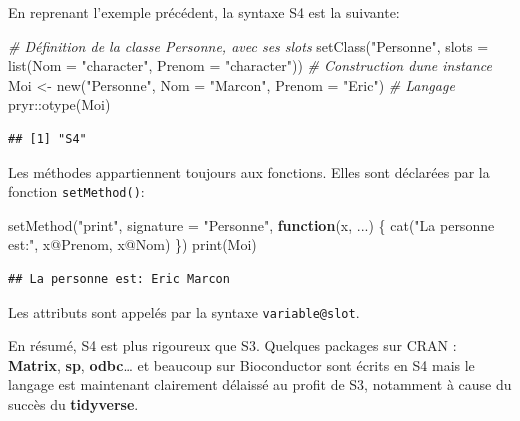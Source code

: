 \documentclass[
  11pt,
  french,
  a4paper,
  extrafontsizes,onecolumn,openright
  ]{memoir}
\newenvironment{Shaded}{\begin{snugshade}}{\end{snugshade}}
\newcommand{\AttributeTok}[1]{\textcolor[rgb]{0.77,0.63,0.00}{#1}}
\newcommand{\CommentTok}[1]{\textcolor[rgb]{0.56,0.35,0.01}{\textit{#1}}}
\newcommand{\ControlFlowTok}[1]{\textcolor[rgb]{0.13,0.29,0.53}{\textbf{#1}}}
\newcommand{\FunctionTok}[1]{\textcolor[rgb]{0.00,0.00,0.00}{#1}}
\newcommand{\NormalTok}[1]{#1}
\newcommand{\OtherTok}[1]{\textcolor[rgb]{0.56,0.35,0.01}{#1}}
\newcommand{\SpecialCharTok}[1]{\textcolor[rgb]{0.00,0.00,0.00}{#1}}
\newcommand{\StringTok}[1]{\textcolor[rgb]{0.31,0.60,0.02}{#1}}
\begin{document}
En reprenant l'exemple précédent, la syntaxe S4 est la suivante:

\scriptsize

\begin{Shaded}
\begin{Highlighting}[]
\CommentTok{\# Définition de la classe Personne, avec ses slots}
\FunctionTok{setClass}\NormalTok{(}\StringTok{"Personne"}\NormalTok{,  }
         \AttributeTok{slots =} \FunctionTok{list}\NormalTok{(}\AttributeTok{Nom =} \StringTok{"character"}\NormalTok{, }\AttributeTok{Prenom =} \StringTok{"character"}\NormalTok{))}
\CommentTok{\# Construction d\textquotesingle{}une instance}
\NormalTok{Moi }\OtherTok{\textless{}{-}} \FunctionTok{new}\NormalTok{(}\StringTok{"Personne"}\NormalTok{, }\AttributeTok{Nom =} \StringTok{"Marcon"}\NormalTok{, }\AttributeTok{Prenom =} \StringTok{"Eric"}\NormalTok{)}
\CommentTok{\# Langage}
\NormalTok{pryr}\SpecialCharTok{::}\FunctionTok{otype}\NormalTok{(Moi)}
\end{Highlighting}
\end{Shaded}

\begin{verbatim}
## [1] "S4"
\end{verbatim}

\normalsize

Les méthodes appartiennent toujours aux fonctions.
Elles sont déclarées par la fonction \texttt{setMethod()}:

\scriptsize

\begin{Shaded}
\begin{Highlighting}[]
\FunctionTok{setMethod}\NormalTok{(}\StringTok{"print"}\NormalTok{, }\AttributeTok{signature =} \StringTok{"Personne"}\NormalTok{, }\ControlFlowTok{function}\NormalTok{(x, ...) \{}
    \FunctionTok{cat}\NormalTok{(}\StringTok{"La personne est:"}\NormalTok{, x}\SpecialCharTok{@}\NormalTok{Prenom, x}\SpecialCharTok{@}\NormalTok{Nom)}
\NormalTok{\})}
\FunctionTok{print}\NormalTok{(Moi)}
\end{Highlighting}
\end{Shaded}

\begin{verbatim}
## La personne est: Eric Marcon
\end{verbatim}

\normalsize

Les attributs sont appelés par la syntaxe \texttt{variable@slot}.

En résumé, S4 est plus rigoureux que S3.
Quelques packages sur CRAN : \textbf{Matrix}, \textbf{sp}, \textbf{odbc}\ldots{} et beaucoup sur Bioconductor sont écrits en S4 mais le langage est maintenant clairement délaissé au profit de S3, notamment à cause du succès du \textbf{tidyverse}.
\end{document}
